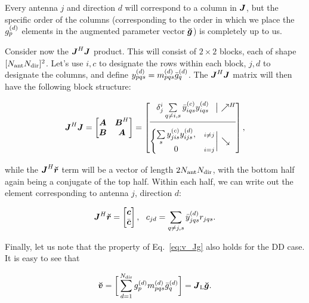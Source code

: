 \documentclass[useAMS,usenatbib]{mn2e}
\makeatletter
\newcommand{\mat}[1]{{\bmath{#1}}}
\newcommand{\JJ}{\mat{J}} %
\newcommand{\JHJ}{\JJ^H\JJ} %
\newcommand{\Matrix}[2]{\left [ \begin{array}{@{}#1@{}}#2\end{array} \right ]}
\newcommand{\AUG}[1]{\bmath{\breve{#1}}}
\newcommand{\Gg}{\AUG{g}}
\newcommand{\Rr}{\AUG{r}}
\newcommand{\Vv}{\AUG{v}}
\newcommand{\LEFT}{\mathrm{L}}
\makeatother
\begin{document}
Every antenna $j$ and direction $d$ will correspond to a column in $\JJ$, but the specific order of the columns 
(corresponding to the order in which we place the $g^{(d)}_p$ elements in the augmented parameter vector $\Gg$)
is completely up to us. 

Consider now the $\JHJ$ product. This will consist of $2\times2$ blocks, each of shape 
$[N_\mathrm{ant}N_\mathrm{dir}]^2$. Let's use $i,c$ to designate the rows within each block, $j,d$ to designate the columns, 
and define $y^{(d)}_{pqs}=m^{(d)}_{pqs}\bar{g}^{(d)}_q$. The $\JHJ$ matrix will then have the following block 
structure:

\begin{equation}
\JHJ = \Matrix{cc}{\bmath{A}&\bmath{B}^H\\\bmath{B}&\bmath{A}}
= \JHJblocks{
  \delta^i_j \sum\limits_{q\ne i,s} \yycH_{iqs} \yyd_{iqs} 
}{
  \left \{ 
  \begin{array}{@{}cc@{}}
   \sum\limits_{s} \yyc_{jis} \yyd_{ijs},&{\scriptstyle i\ne j} \\
   0 &{\scriptstyle i=j}
  \end{array} \right . 
},
\label{eq:JHJ:DD:unpol}
\end{equation}

while the $\JJ^H\Rr$ term will be a vector of length $2N_\mathrm{ant}N_\mathrm{dir}$, with the bottom half again being
a conjugate of the top half. Within each half, we can write out the element corresponding to 
antenna $j$, direction $d$: 

\begin{equation}
\label{eq:JHR:DD:unpol}
\JJ^H\Rr = \Matrix{c}{\bmath{c}\\\bar{\bmath{c}}},~~c_{jd} = \sum\limits_{q\ne j,s} 
\yydH_{jqs} r_{jqs}.
\end{equation}

Finally, let us note that the property of Eq.~\ref{eq:v_Jg} also holds for the DD case. It is easy to see that

\begin{equation}
\label{eq:v_Jg:dd}
\Vv = \bigg [ \sum_{d=1}^{\Nd} \ggd_p \mmd_{pqs} \ggdH_q \bigg ] = \JJ_\LEFT \Gg.
\end{equation}
\end{document}
